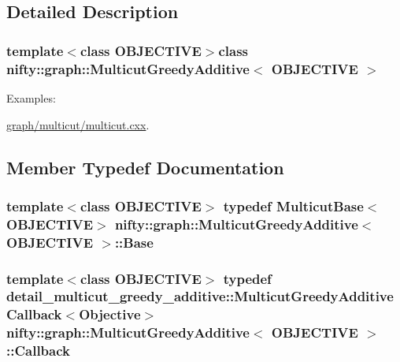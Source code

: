 \subsection{Detailed Description}
\subsubsection*{template$<$class O\+B\+J\+E\+C\+T\+I\+V\+E$>$class nifty\+::graph\+::\+Multicut\+Greedy\+Additive$<$ O\+B\+J\+E\+C\+T\+I\+V\+E $>$}

\begin{Desc}
\item[Examples\+: ]\par
\hyperlink{graph_2multicut_2multicut_8cxx-example}{graph/multicut/multicut.\+cxx}.\end{Desc}


\subsection{Member Typedef Documentation}
\hypertarget{classnifty_1_1graph_1_1MulticutGreedyAdditive_ae260038d8c5bcec7a0bfe88733f05cca}{}
\subsubsection[{Base}]{\setlength{\rightskip}{0pt plus 5cm}template$<$class O\+B\+J\+E\+C\+T\+I\+V\+E$>$ typedef {\bf Multicut\+Base}$<$O\+B\+J\+E\+C\+T\+I\+V\+E$>$ {\bf nifty\+::graph\+::\+Multicut\+Greedy\+Additive}$<$ O\+B\+J\+E\+C\+T\+I\+V\+E $>$\+::{\bf Base}}\label{classnifty_1_1graph_1_1MulticutGreedyAdditive_ae260038d8c5bcec7a0bfe88733f05cca}
\hypertarget{classnifty_1_1graph_1_1MulticutGreedyAdditive_a5079d951379543ca00c28fc14e7d73dd}{}
\subsubsection[{Callback}]{\setlength{\rightskip}{0pt plus 5cm}template$<$class O\+B\+J\+E\+C\+T\+I\+V\+E$>$ typedef detail\+\_\+multicut\+\_\+greedy\+\_\+additive\+::\+Multicut\+Greedy\+Additive\+Callback$<${\bf Objective}$>$ {\bf nifty\+::graph\+::\+Multicut\+Greedy\+Additive}$<$ O\+B\+J\+E\+C\+T\+I\+V\+E $>$\+::{\bf Callback}}\label{classnifty_1_1graph_1_1MulticutGreedyAdditive_a5079d951379543ca00c28fc14e7d73dd}
\hypertarget{classnifty_1_1graph_1_1MulticutGreedyAdditive_a55aa2b8b11b45f02ea0e5c8874a39533}{}
